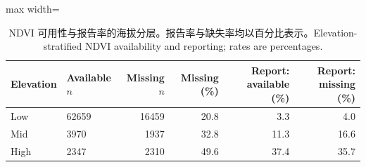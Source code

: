 \begin{table}[htbp]\centering\footnotesize
\caption{\ifzh NDVI 可用性与报告率的海拔分层。报告率与缺失率均以百分比表示。\else Elevation-stratified NDVI availability and reporting; rates are percentages.\fi}\label{tab:envmissing}
\begin{adjustbox}{max width=\linewidth}\begin{tabular}{llrrrr}\toprule
Elevation & Available $n$ & Missing $n$ & Missing (\%) & Report: available (\%) & Report: missing (\%) \\ \midrule
Low & 62659 & 16459 & 20.8 & 3.3 & 4.0 \\
Mid & 3970 & 1937 & 32.8 & 11.3 & 16.6 \\
High & 2347 & 2310 & 49.6 & 37.4 & 35.7 \\
\bottomrule\end{tabular}\end{adjustbox}

\end{table}
